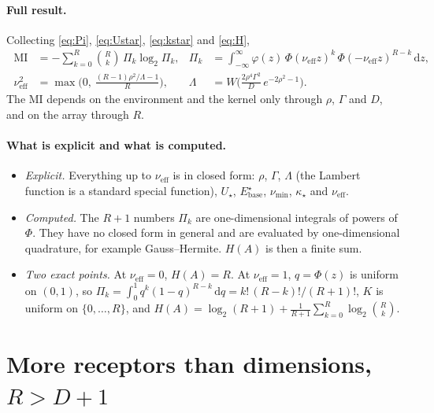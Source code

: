 \documentclass[11pt,a4paper]{article}
\newcommand{\Ebase}{E_{\mathrm{base}}}
\newcommand{\nueff}{\nu_{\mathrm{eff}}}
\begin{document}
\paragraph{Full result.} Collecting \eqref{eq:Pi}, \eqref{eq:Ustar}, \eqref{eq:kstar}
and \eqref{eq:H},
\begin{equation}
  \boxed{\;
  \begin{aligned}
    \mathrm{MI}&=-\sum_{k=0}^{R}\binom Rk\,\Pi_k\log_2\Pi_k,
    &\Pi_k&=\int_{-\infty}^{\infty}\varphi(z)\,\Phi(\nueff z)^k\,\Phi(-\nueff z)^{R-k}\,\mathrm dz,\\
    \nueff^2&=\max\Big(0,\ \frac{(R-1)\rho^2/\Lambda-1}{R}\Big),
    &\Lambda&=W\Big(\frac{2\rho^4\Gamma^2}{D}\,e^{-2\rho^2-1}\Big).
  \end{aligned}\;}
  \label{eq:result}
\end{equation}
The MI depends on the environment and the kernel only through $\rho$, $\Gamma$ and $D$, and
on the array through $R$.

\paragraph{What is explicit and what is computed.}
\begin{itemize}
\item \emph{Explicit.} Everything up to $\nueff$ is in closed form: $\rho$, $\Gamma$,
  $\Lambda$ (the Lambert function is a standard special function), $U_\star$,
  $\Ebase^\star$, $\nu_{\min}$, $\kappa_\star$ and $\nueff$.
\item \emph{Computed.} The $R+1$ numbers $\Pi_k$ are one-dimensional integrals of powers
  of $\Phi$. They have no closed form in general and are evaluated by one-dimensional
  quadrature, for example Gauss--Hermite. $H(A)$ is then a finite sum.
\item \emph{Two exact points.} At $\nueff=0$, $H(A)=R$. At $\nueff=1$, $q=\Phi(z)$ is
  uniform on $(0,1)$, so $\Pi_k=\int_0^1q^k(1-q)^{R-k}\,\mathrm dq=k!\,(R-k)!/(R+1)!$,
  $K$ is uniform on $\{0,\dots,R\}$, and
  $H(A)=\log_2(R+1)+\frac{1}{R+1}\sum_{k=0}^R\log_2\binom Rk$.
\end{itemize}

\section{More receptors than dimensions, \texorpdfstring{$R>D+1$}{R>D+1}}
\label{sec:corner}
\end{document}

